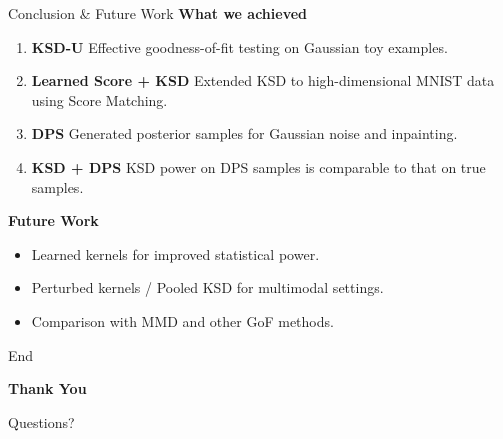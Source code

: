 \documentclass[aspectratio=43]{beamer}
\begin{document}
\begin{frame}{Conclusion \& Future Work}
\textbf{What we achieved}
\begin{enumerate}
    \item \textbf{KSD-U}
    Effective goodness-of-fit testing on Gaussian toy examples.
    \item \textbf{Learned Score + KSD}
    Extended KSD to high-dimensional MNIST data using Score Matching.
    \item \textbf{DPS}
    Generated posterior samples for Gaussian noise and inpainting.
    \item \textbf{KSD + DPS}
    KSD power on DPS samples is comparable to that on true samples.
\end{enumerate}

\vspace{0.25cm}
\textbf{Future Work}
\begin{itemize}
    \item Learned kernels for improved statistical power.
    \item Perturbed kernels / Pooled KSD for multimodal settings.
    \item Comparison with MMD and other GoF methods.
\end{itemize}
\end{frame}

\begin{frame}{End}
\begin{center}
\vfill
{\Huge \textbf{Thank You}}
\vspace{0.5cm}
\end{center}

\begin{center}
{\Large Questions?}
\vfill
\end{center}
\end{frame}
\end{document}
